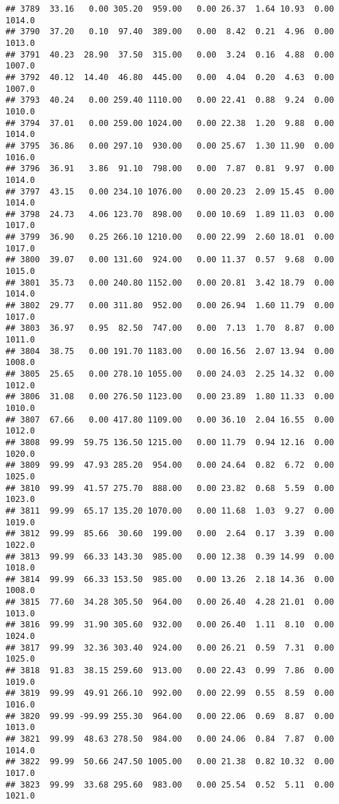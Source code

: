 \documentclass{article}\usepackage{graphicx, color}
\makeatletter
\newenvironment{kframe}{%
 \def\at@end@of@kframe{}%
 \ifinner\ifhmode%
  \def\at@end@of@kframe{\end{minipage}}%
  \begin{minipage}{\columnwidth}%
 \fi\fi%
 \def\FrameCommand##1{\hskip\@totalleftmargin \hskip-\fboxsep
 \colorbox{shadecolor}{##1}\hskip-\fboxsep
     \hskip-\linewidth \hskip-\@totalleftmargin \hskip\columnwidth}%
 \MakeFramed {\advance\hsize-\width
   \@totalleftmargin\z@ \linewidth\hsize
   \@setminipage}}%
 {\par\unskip\endMakeFramed%
 \at@end@of@kframe}
\newenvironment{knitrout}{}{} %
\makeatother
\begin{document}
\begin{knitrout}
\begin{kframe}
\begin{verbatim}
## 3789  33.16   0.00 305.20  959.00   0.00 26.37  1.64 10.93  0.00 1014.0
## 3790  37.20   0.10  97.40  389.00   0.00  8.42  0.21  4.96  0.00 1013.0
## 3791  40.23  28.90  37.50  315.00   0.00  3.24  0.16  4.88  0.00 1007.0
## 3792  40.12  14.40  46.80  445.00   0.00  4.04  0.20  4.63  0.00 1007.0
## 3793  40.24   0.00 259.40 1110.00   0.00 22.41  0.88  9.24  0.00 1010.0
## 3794  37.01   0.00 259.00 1024.00   0.00 22.38  1.20  9.88  0.00 1014.0
## 3795  36.86   0.00 297.10  930.00   0.00 25.67  1.30 11.90  0.00 1016.0
## 3796  36.91   3.86  91.10  798.00   0.00  7.87  0.81  9.97  0.00 1014.0
## 3797  43.15   0.00 234.10 1076.00   0.00 20.23  2.09 15.45  0.00 1014.0
## 3798  24.73   4.06 123.70  898.00   0.00 10.69  1.89 11.03  0.00 1017.0
## 3799  36.90   0.25 266.10 1210.00   0.00 22.99  2.60 18.01  0.00 1017.0
## 3800  39.07   0.00 131.60  924.00   0.00 11.37  0.57  9.68  0.00 1015.0
## 3801  35.73   0.00 240.80 1152.00   0.00 20.81  3.42 18.79  0.00 1014.0
## 3802  29.77   0.00 311.80  952.00   0.00 26.94  1.60 11.79  0.00 1017.0
## 3803  36.97   0.95  82.50  747.00   0.00  7.13  1.70  8.87  0.00 1011.0
## 3804  38.75   0.00 191.70 1183.00   0.00 16.56  2.07 13.94  0.00 1008.0
## 3805  25.65   0.00 278.10 1055.00   0.00 24.03  2.25 14.32  0.00 1012.0
## 3806  31.08   0.00 276.50 1123.00   0.00 23.89  1.80 11.33  0.00 1010.0
## 3807  67.66   0.00 417.80 1109.00   0.00 36.10  2.04 16.55  0.00 1012.0
## 3808  99.99  59.75 136.50 1215.00   0.00 11.79  0.94 12.16  0.00 1020.0
## 3809  99.99  47.93 285.20  954.00   0.00 24.64  0.82  6.72  0.00 1025.0
## 3810  99.99  41.57 275.70  888.00   0.00 23.82  0.68  5.59  0.00 1023.0
## 3811  99.99  65.17 135.20 1070.00   0.00 11.68  1.03  9.27  0.00 1019.0
## 3812  99.99  85.66  30.60  199.00   0.00  2.64  0.17  3.39  0.00 1022.0
## 3813  99.99  66.33 143.30  985.00   0.00 12.38  0.39 14.99  0.00 1018.0
## 3814  99.99  66.33 153.50  985.00   0.00 13.26  2.18 14.36  0.00 1008.0
## 3815  77.60  34.28 305.50  964.00   0.00 26.40  4.28 21.01  0.00 1013.0
## 3816  99.99  31.90 305.60  932.00   0.00 26.40  1.11  8.10  0.00 1024.0
## 3817  99.99  32.36 303.40  924.00   0.00 26.21  0.59  7.31  0.00 1025.0
## 3818  91.83  38.15 259.60  913.00   0.00 22.43  0.99  7.86  0.00 1019.0
## 3819  99.99  49.91 266.10  992.00   0.00 22.99  0.55  8.59  0.00 1016.0
## 3820  99.99 -99.99 255.30  964.00   0.00 22.06  0.69  8.87  0.00 1013.0
## 3821  99.99  48.63 278.50  984.00   0.00 24.06  0.84  7.87  0.00 1014.0
## 3822  99.99  50.66 247.50 1005.00   0.00 21.38  0.82 10.32  0.00 1017.0
## 3823  99.99  33.68 295.60  983.00   0.00 25.54  0.52  5.11  0.00 1021.0

\end{verbatim}
\end{kframe}
\end{knitrout}
\end{document}
